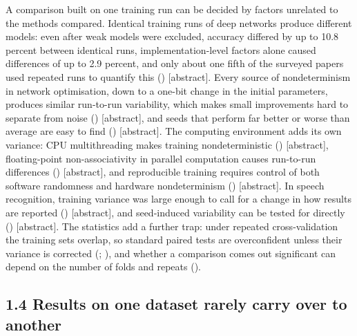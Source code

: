 \documentclass[11pt,a4paper]{article}
\begin{document}
A comparison built on one training run can be decided by factors unrelated to the methods
compared. Identical training runs of deep networks produce different models: even after
weak models were excluded, accuracy differed by up to 10.8 percent between identical
runs, implementation-level factors alone caused differences of up to 2.9 percent, and
only about one fifth of the surveyed papers used repeated runs to quantify this (\citealp{Pham_2020}) {[}abstract{]}. Every source of nondeterminism in network optimisation, down to a
one-bit change in the initial parameters, produces similar run-to-run variability, which
makes small improvements hard to separate from noise (\citealp{Summers2021arxiv})
{[}abstract{]}, and seeds that perform far better or worse than average are easy to find
(\citealp{Picard2021arxiv}) {[}abstract{]}. The computing environment adds its own variance: CPU
multithreading makes training nondeterministic (\citealp{Xiao_2021}) {[}abstract{]},
floating-point non-associativity in parallel computation causes run-to-run differences
(\citealp{Shanmugavelu_2024}) {[}abstract{]}, and reproducible training requires control of
both software randomness and hardware nondeterminism (\citealp{Chen_2022}) {[}abstract{]}. In
speech recognition, training variance was large enough to call for a change in how
results are reported (\citealp{van_den_Berg_2017}) {[}abstract{]}, and seed-induced variability
can be tested for directly (\citealp{Banerjee_2025}) {[}abstract{]}. The statistics add a further
trap: under repeated cross-validation the training sets overlap, so standard paired
tests are overconfident unless their variance is corrected (\citealp{Nadeau_2003};
\citealp{Bouckaert_2004}), and whether a comparison comes out significant can depend on
the number of folds and repeats (\citealp{Jafrasteh_2025}).

\subsection{1.4 Results on one dataset rarely carry over to another}\label{results-on-one-dataset-rarely-carry-over-to-another}
\end{document}
